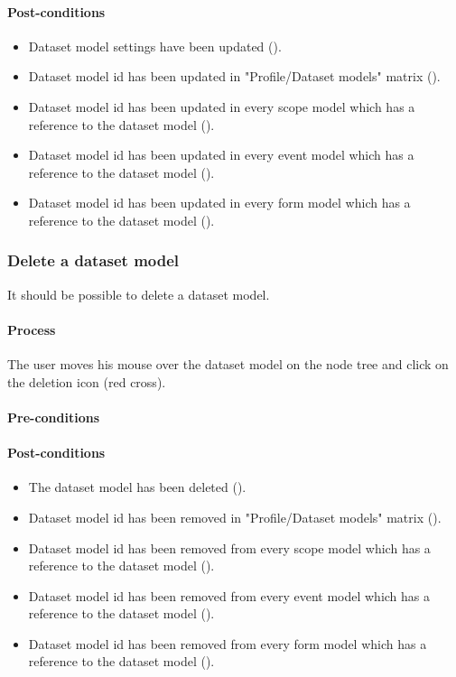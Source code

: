 \documentclass[11pt,a4paper,oneside]{article}
\begin{document}
\paragraph{Post-conditions}
\begin{itemize}
	\item Dataset model settings have been updated ().
	\item Dataset model id has been updated in "Profile/Dataset models" matrix ().
	\item Dataset model id has been updated in every scope model which has a reference to the dataset model ().
	\item Dataset model id has been updated in every event model which has a reference to the dataset model ().
	\item Dataset model id has been updated in every form model which has a reference to the dataset model ().
\end{itemize}

\subsubsection{Delete a dataset model}
It should be possible to delete a dataset model.

\paragraph{Process}
The user moves his mouse over the dataset model on the node tree and click on the deletion icon (red cross).

\paragraph{Pre-conditions}

\paragraph{Post-conditions}
\begin{itemize}
	\item The dataset model has been deleted ().
	\item Dataset model id has been removed in "Profile/Dataset models" matrix ().
	\item Dataset model id has been removed from every scope model which has a reference to the dataset model ().
	\item Dataset model id has been removed from every event model which has a reference to the dataset model ().
	\item Dataset model id has been removed from every form model which has a reference to the dataset model ().
\end{itemize}
\end{document}
